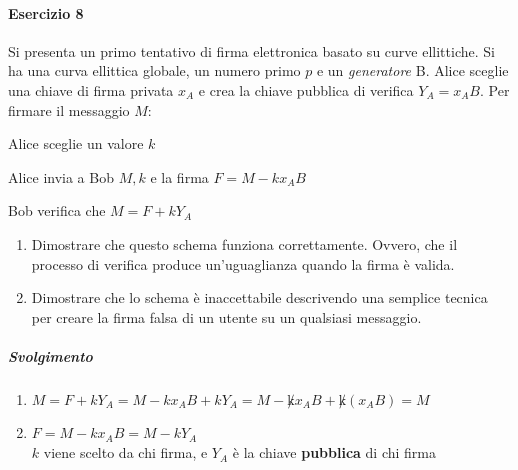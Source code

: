 \documentclass[10pt]{book}
\begin{document}
\paragraph{Esercizio 8}Si presenta un primo tentativo di firma elettronica basato su curve ellittiche. Si ha una curva ellittica globale, un numero primo $p$ e un \textit{generatore} B. Alice sceglie una chiave di firma privata $x_A$ e crea la chiave pubblica di verifica $Y_A = x_AB$. Per firmare il messaggio $M$:
\begin{list}{}{}
	\item Alice sceglie un valore $k$
	\item Alice invia a Bob $M,k$ e la firma $F = M - kx_AB$
	\item Bob verifica che $M = F + kY_A$
\end{list}
\begin{enumerate}
	\item Dimostrare che questo schema funziona correttamente. Ovvero, che il processo di verifica produce un'uguaglianza quando la firma è valida.
	\item Dimostrare che lo schema è inaccettabile descrivendo una semplice tecnica per creare la firma falsa di un utente su un qualsiasi messaggio.
\end{enumerate}
\subparagraph{Svolgimento} \begin{enumerate}
	\item $M = F + kY_A = M - kx_AB + kY_A = M - \not kx_AB + \not k(x_AB) = M$
	\item $F = M - kx_AB = M - kY_A$\\
	$k$ viene scelto da chi firma, e $Y_A$ è la chiave \textbf{pubblica} di chi firma
\end{enumerate}
\pagebreak
\end{document}
